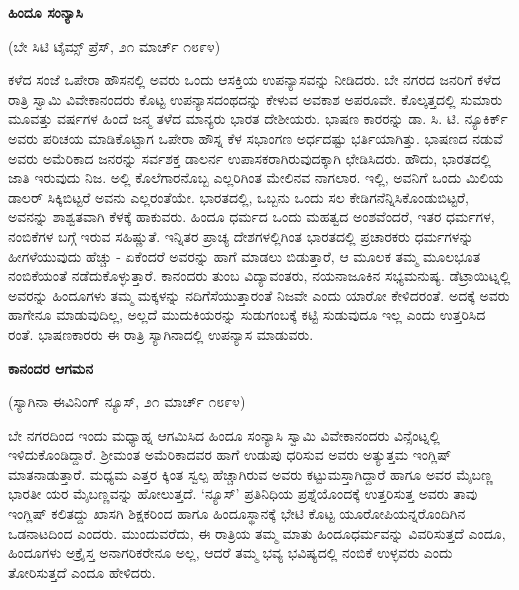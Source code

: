 \begin{center}
\textbf{ಹಿಂದೂ ಸಂನ್ಯಾಸಿ}
\end{center}

\begin{center}
(ಬೇ ಸಿಟಿ ಟೈಮ್ಸ್ ಪ್ರೆಸ್, ೨೧ ಮಾರ್ಚ್ ೧೮೯೪)
\end{center}

ಕಳೆದ ಸಂಜೆ ಒಪೇರಾ ಹೌಸನಲ್ಲಿ ಅವರು ಒಂದು ಆಸಕ್ತಿಯ ಉಪನ್ಯಾಸವನ್ನು ನೀಡಿದರು. ಬೇ ನಗರದ ಜನರಿಗೆ ಕಳೆದ ರಾತ್ರಿ ಸ್ವಾಮಿ ವಿವೇಕಾನಂದರು ಕೊಟ್ಟ ಉಪನ್ಯಾಸದಂಥದನ್ನು ಕೇಳುವ ಅವಕಾಶ ಅಪರೂವೇ. ಕೊಲ್ಕತ್ತದಲ್ಲಿ ಸುಮಾರು ಮೂವತ್ತು ವರ್ಷಗಳ ಹಿಂದೆ ಜನ್ಮ ತಳೆದ ಮಾನ್ಯರು ಭಾರತ ದೇಶೀಯರು. ಭಾಷಣ ಕಾರರನ್ನು ಡಾ. ಸಿ. ಟಿ. ನ್ಯೂಕಿರ್ಕ್ ಅವರು ಪರಿಚಯ ಮಾಡಿಕೊಟ್ಟಾಗ ಒಪೇರಾ ಹೌಸ್ನ ಕೆಳ ಸಭಾಂಗಣ ಅರ್ಧದಷ್ಟು ಭರ್ತಿಯಾಗಿತ್ತು. ಭಾಷಣದ ನಡುವೆ ಅವರು ಅಮೆರಿಕಾದ ಜನರನ್ನು ಸರ್ವಶಕ್ತ ಡಾಲರ್ನ ಉಪಾಸಕರಾಗಿರುವುದಕ್ಕಾಗಿ ಛೇಡಿಸಿದರು. ಹೌದು, ಭಾರತದಲ್ಲಿ ಜಾತಿ ಇರುವುದು ನಿಜ. ಅಲ್ಲಿ ಕೊಲೆಗಾರನೊಬ್ಬ ಎಲ್ಲರಿಗಿಂತ ಮೇಲಿನವ ನಾಗಲಾರ. ಇಲ್ಲಿ, ಅವನಿಗೆ ಒಂದು ಮಿಲಿಯ ಡಾಲರ್ ಸಿಕ್ಕಿಬಿಟ್ಟರೆ ಅವನು ಎಲ್ಲರಂತೆಯೇ. ಭಾರತದಲ್ಲಿ, ಒಬ್ಬನು ಒಂದು ಸಲ ಕೇಡಿಗನೆನ್ನಿಸಿಕೊಂಡುಬಿಟ್ಟರೆ, ಅವನನ್ನು ಶಾಶ್ವತವಾಗಿ ಕೆಳಕ್ಕೆ ಹಾಕುವರು. ಹಿಂದೂ ಧರ್ಮದ ಒಂದು ಮಹತ್ವದ ಅಂಶವೆಂದರೆ, ಇತರ ಧರ್ಮಗಳ, ನಂಬಿಕೆಗಳ ಬಗ್ಗೆ ಇರುವ ಸಹಿಷ್ಣುತೆ. ಇನ್ನಿತರ ಪ್ರಾಚ್ಯ ದೇಶಗಳಲ್ಲಿಗಿಂತ ಭಾರತದಲ್ಲಿ ಪ್ರಚಾರಕರು ಧರ್ಮಗಳನ್ನು ಹೀಗಳೆಯುವುದು ಹೆಚ್ಚು - ಏಕೆಂದರೆ ಅವರನ್ನು ಹಾಗೆ ಮಾಡಲು ಬಿಡುತ್ತಾರೆ, ಆ ಮೂಲಕ ತಮ್ಮ ಮೂಲಭೂತ ನಂಬಿಕೆಯಂತೆ ನಡೆದುಕೊಳ್ಳುತ್ತಾರೆ. ಕಾನಂದರು ತುಂಬ ವಿದ್ಯಾವಂತರು, ನಯನಾಜೂಕಿನ ಸಭ್ಯಮನುಷ್ಯ. ಡೆಟ್ರಾಯಿಟ್ನಲ್ಲಿ ಅವರನ್ನು ಹಿಂದೂಗಳು ತಮ್ಮ ಮಕ್ಕಳನ್ನು ನದಿಗೆಸೆಯುತ್ತಾರಂತೆ ನಿಜವೇ ಎಂದು ಯಾರೋ ಕೇಳಿದರಂತೆ. ಅದಕ್ಕೆ ಅವರು ಹಾಗೇನೂ ಮಾಡುವುದಿಲ್ಲ, ಅಲ್ಲದೆ ಮುದುಕಿಯರನ್ನು ಸುಡುಗಂಬಕ್ಕೆ ಕಟ್ಟಿ ಸುಡುವುದೂ ಇಲ್ಲ ಎಂದು ಉತ್ತರಿಸಿದ ರಂತೆ. ಭಾಷಣಕಾರರು ಈ ರಾತ್ರಿ ಸ್ಯಾಗಿನಾದಲ್ಲಿ ಉಪನ್ಯಾಸ ಮಾಡುವರು.

\begin{center}
\textbf{ಕಾನಂದರ ಆಗಮನ}
\end{center}

\begin{center}
(ಸ್ಯಾಗಿನಾ ಈವಿನಿಂಗ್ ನ್ಯೂಸ್, ೨೧ ಮಾರ್ಚ್ ೧೮೯೪)
\end{center}

ಬೇ ನಗರದಿಂದ ಇಂದು ಮಧ್ಯಾಹ್ನ ಆಗಮಿಸಿದ ಹಿಂದೂ ಸಂನ್ಯಾಸಿ ಸ್ವಾಮಿ ವಿವೇಕಾನಂದರು ವಿನ್ಸೆಂಟ್ನಲ್ಲಿ ಇಳಿದುಕೊಂಡಿದ್ದಾರೆ. ಶ‍್ರೀಮಂತ ಅಮೆರಿಕಾದವರ ಹಾಗೆ ಉಡುಪು ಧರಿಸುವ ಅವರು ಅತ್ಯುತ್ತಮ ಇಂಗ್ಲಿಷ್ ಮಾತನಾಡುತ್ತಾರೆ. ಮಧ್ಯಮ ಎತ್ತರ ಕ್ಕಿಂತ ಸ್ವಲ್ಪ ಹೆಚ್ಚಾಗಿರುವ ಅವರು ಕಟ್ಟುಮಸ್ತಾಗಿದ್ದಾರೆ ಹಾಗೂ ಅವರ ಮೈಬಣ್ಣ ಭಾರತೀ ಯರ ಮೈಬಣ್ಣವನ್ನು ಹೋಲುತ್ತದೆ. ‘ನ್ಯೂಸ್’ ಪ್ರತಿನಿಧಿಯ ಪ್ರಶ್ನೆಯೊಂದಕ್ಕೆ ಉತ್ತರಿಸುತ್ತ ಅವರು ತಾವು ಇಂಗ್ಲಿಷ್ ಕಲಿತದ್ದು ಖಾಸಗಿ ಶಿಕ್ಷಕರಿಂದ ಹಾಗೂ ಹಿಂದೂಸ್ಥಾನಕ್ಕೆ ಭೇಟಿ ಕೊಟ್ಟ ಯೂರೋಪಿಯನ್ನರೊಂದಿಗಿನ ಒಡನಾಟದಿಂದ ಎಂದರು. ಮುಂದುವರೆದು, ಈ ರಾತ್ರಿಯ ತಮ್ಮ ಮಾತು ಹಿಂದೂಧರ್ಮವನ್ನು ವಿವರಿಸುತ್ತದೆ ಎಂದೂ, ಹಿಂದೂಗಳು ಅಕ್ರೈಸ್ತ ಅನಾಗರಿಕರೇನೂ ಅಲ್ಲ, ಆದರೆ ತಮ್ಮ ಭವ್ಯ ಭವಿಷ್ಯದಲ್ಲಿ ನಂಬಿಕೆ ಉಳ್ಳವರು ಎಂದು ತೋರಿಸುತ್ತದೆ ಎಂದೂ ಹೇಳಿದರು.

